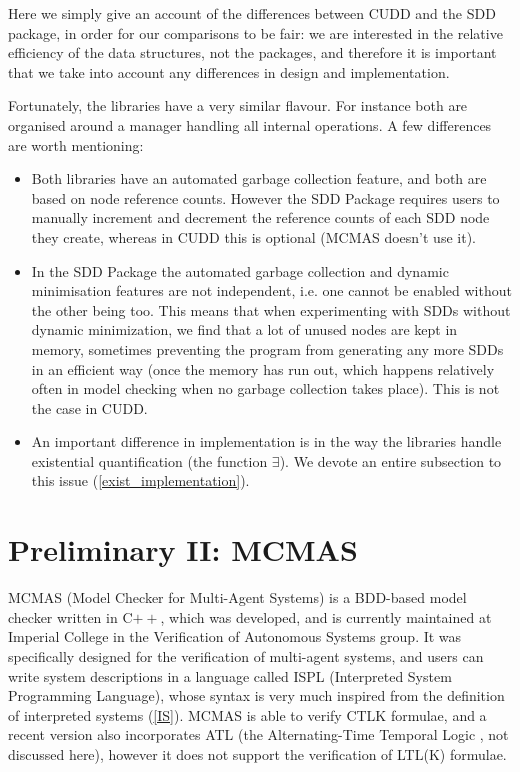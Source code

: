 \documentclass[11pt]{report}
\begin{document}
Here we simply give an account of the differences between  CUDD and the SDD package, in order for our comparisons to be fair: we are interested in the relative efficiency of the data structures, not the packages, and therefore it is important that we take into account any differences in design and implementation. 

Fortunately, the libraries have a very similar flavour. For instance both are organised around a manager handling all internal operations. A few differences are worth mentioning:
\begin{itemize}
\item Both libraries have an automated garbage collection feature, and both are based on node reference counts. However the SDD Package requires users to manually increment and decrement the reference counts of each SDD node they create, whereas in CUDD this is optional (MCMAS doesn't use it). 
\item In the SDD Package the automated garbage collection and dynamic minimisation features are not independent, i.e. one cannot be enabled without the other being too. This means that when experimenting with SDDs without dynamic minimization, we find that a lot of unused nodes are kept in memory, sometimes preventing the program from generating any more SDDs in an efficient way (once the memory has run out, which happens relatively often in model checking when no garbage collection takes place). This is not the case in CUDD. 
\item An important difference in implementation is in the way the libraries handle existential quantification (the function $\exists$). We devote an entire subsection to this issue (\ref{exist_implementation}).

\end{itemize}
\label{gc}

\section{Preliminary II: MCMAS} 
\label{mcmas}

MCMAS (Model Checker for Multi-Agent Systems) is a BDD-based model checker written in C$++$, which was developed, and is currently maintained at Imperial College in the Verification of Autonomous Systems group. It was specifically designed for the verification of multi-agent systems, and users can write system descriptions in a language called ISPL (Interpreted System Programming Language), whose syntax is very much inspired from the definition of interpreted systems (\ref{IS}). MCMAS is able to verify CTLK formulae, and a recent version also incorporates ATL (the Alternating-Time Temporal Logic \cite{atl}, not discussed here), however it does not support the verification of LTL(K) formulae.
\end{document}
